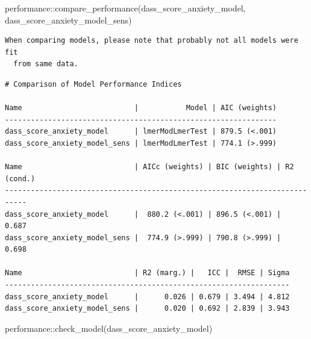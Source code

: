 \documentclass[
  letterpaper,
  DIV=11,
  numbers=noendperiod]{scrartcl}
\newenvironment{Shaded}{\begin{snugshade}}{\end{snugshade}}
\newcommand{\FunctionTok}[1]{\textcolor[rgb]{0.28,0.35,0.67}{#1}}
\newcommand{\NormalTok}[1]{\textcolor[rgb]{0.00,0.23,0.31}{#1}}
\newcommand{\SpecialCharTok}[1]{\textcolor[rgb]{0.37,0.37,0.37}{#1}}
\begin{document}
\begin{Shaded}
\begin{Highlighting}[]
\NormalTok{performance}\SpecialCharTok{::}\FunctionTok{compare\_performance}\NormalTok{(dass\_score\_anxiety\_model, dass\_score\_anxiety\_model\_sens)}
\end{Highlighting}
\end{Shaded}

\begin{verbatim}
When comparing models, please note that probably not all models were fit
  from same data.
\end{verbatim}

\begin{verbatim}
# Comparison of Model Performance Indices

Name                          |           Model | AIC (weights)
---------------------------------------------------------------
dass_score_anxiety_model      | lmerModLmerTest | 879.5 (<.001)
dass_score_anxiety_model_sens | lmerModLmerTest | 774.1 (>.999)

Name                          | AICc (weights) | BIC (weights) | R2 (cond.)
---------------------------------------------------------------------------
dass_score_anxiety_model      |  880.2 (<.001) | 896.5 (<.001) |      0.687
dass_score_anxiety_model_sens |  774.9 (>.999) | 790.8 (>.999) |      0.698

Name                          | R2 (marg.) |   ICC |  RMSE | Sigma
------------------------------------------------------------------
dass_score_anxiety_model      |      0.026 | 0.679 | 3.494 | 4.812
dass_score_anxiety_model_sens |      0.020 | 0.692 | 2.839 | 3.943
\end{verbatim}

\begin{Shaded}
\begin{Highlighting}[]
\NormalTok{performance}\SpecialCharTok{::}\FunctionTok{check\_model}\NormalTok{(dass\_score\_anxiety\_model)}
\end{Highlighting}
\end{Shaded}
\end{document}
